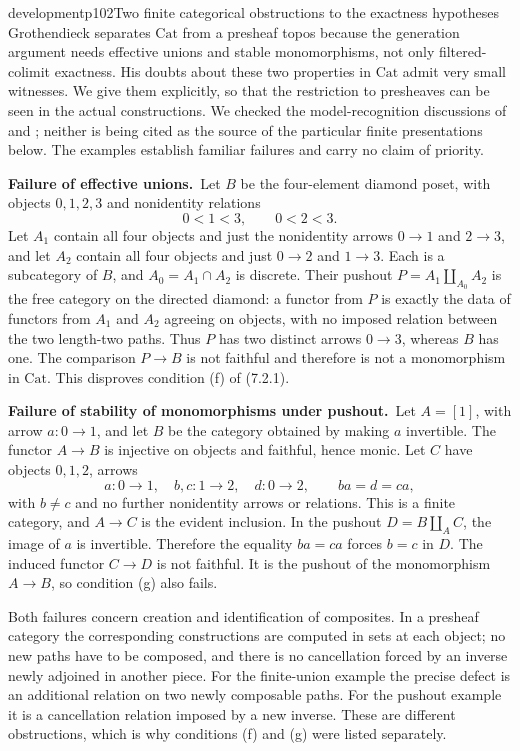 \begin{dcomment}{development}{p102}{Two finite categorical obstructions to the exactness hypotheses}
Grothendieck separates $\mathrm{Cat}$ from a presheaf topos because the generation argument needs effective unions and stable monomorphisms, not only filtered-colimit exactness. His doubts about these two properties in $\mathrm{Cat}$ admit very small witnesses. We give them explicitly, so that the restriction to presheaves can be seen in the actual constructions. We checked the model-recognition discussions of \citet[Section 1]{Beke2000} and \citet[Sections 1.2 and 4.2]{Cisinski2006}; neither is being cited as the source of the particular finite presentations below. The examples establish familiar failures and carry no claim of priority.

\textbf{Failure of effective unions.}\ours\ Let $B$ be the four-element diamond poset, with objects $0,1,2,3$ and nonidentity relations
\[
 0<1<3,\qquad 0<2<3.
\]
Let $A_1$ contain all four objects and just the nonidentity arrows $0\to1$ and $2\to3$, and let $A_2$ contain all four objects and just $0\to2$ and $1\to3$. Each is a subcategory of $B$, and $A_0=A_1\cap A_2$ is discrete. Their pushout $P=A_1\amalg_{A_0}A_2$ is the free category on the directed diamond: a functor from $P$ is exactly the data of functors from $A_1$ and $A_2$ agreeing on objects, with no imposed relation between the two length-two paths. Thus $P$ has two distinct arrows $0\to3$, whereas $B$ has one. The comparison $P\to B$ is not faithful and therefore is not a monomorphism in $\mathrm{Cat}$. This disproves condition (f) of (7.2.1).

\textbf{Failure of stability of monomorphisms under pushout.}\ours\ Let $A=[1]$, with arrow $a:0\to1$, and let $B$ be the category obtained by making $a$ invertible. The functor $A\to B$ is injective on objects and faithful, hence monic. Let $C$ have objects $0,1,2$, arrows
\[
 a:0\to1,\quad b,c:1\to2,\quad d:0\to2,
 \qquad ba=d=ca,
\]
with $b\neq c$ and no further nonidentity arrows or relations. This is a finite category, and $A\to C$ is the evident inclusion. In the pushout $D=B\amalg_A C$, the image of $a$ is invertible. Therefore the equality $ba=ca$ forces $b=c$ in $D$. The induced functor $C\to D$ is not faithful. It is the pushout of the monomorphism $A\to B$, so condition (g) also fails.

Both failures concern creation and identification of composites. In a presheaf category the corresponding constructions are computed in sets at each object; no new paths have to be composed, and there is no cancellation forced by an inverse newly adjoined in another piece. For the finite-union example the precise defect is an additional relation on two newly composable paths. For the pushout example it is a cancellation relation imposed by a new inverse. These are different obstructions, which is why conditions (f) and (g) were listed separately.
\end{dcomment}

